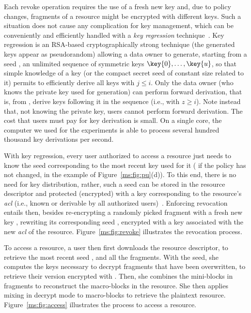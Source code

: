 Each revoke operation requires the use of a fresh new key and, due to policy changes, fragments of a resource might be encrypted with different keys. Such a situation does not cause any complication for key management, which can be conveniently and efficiently handled with a {\em key regression\/} technique~\cite{fkk06}. Key regression is an RSA-based cryptographically strong technique (the generated keys appear as pseudorandom) allowing a data owner to generate, starting from a seed , an unlimited sequence of symmetric keys $\key{0},\ldots,\key{u}$, so that simple knowledge of a key  (or the compact secret seed  of constant size related to it) permits to efficiently derive all keys  with $j\leq i$. Only the data owner (who knows the private key used for generation) can perform forward derivation, that is, from , derive keys following it in the sequence (i.e.,  with $z\geq i$). Note instead that, not knowing the private key, users cannot perform forward derivation. The cost that users must pay for key derivation is small. On a single core, the computer we used for the experiments is able to process several hundred thousand key derivations per second.

With key regression, every user authorized to access a resource just needs to know the seed corresponding to the most recent key used for it ( if the policy has not changed,  in the example of Figure~\ref{ms:fig:pu}(d)). To this end, there is no need for key distribution, rather, such a seed can be stored in the resource descriptor and protected (encrypted) with a key corresponding to the resource's {\em acl\/} (i.e., known or derivable by all authorized users)~\cite{afb05,vldb07}. Enforcing revocation entails then, besides re-encrypting a randomly picked fragment with a fresh new key , rewriting its corresponding seed , encrypted with a key associated with the new {\em acl\/} of the resource. Figure~\ref{ms:fig:revoke} illustrates the revocation process.

To access a resource, a user then first downloads the resource descriptor, to retrieve the most recent seed , and all the fragments. With the seed, she computes the keys necessary to decrypt fragments that have been overwritten, to retrieve their version encrypted with . Then, she combines the mini-blocks in fragments to reconstruct the macro-blocks in the resource. She then applies mixing in decrypt mode to macro-blocks to retrieve the plaintext resource. Figure~\ref{ms:fig:access} illustrates the process to access a resource. 

